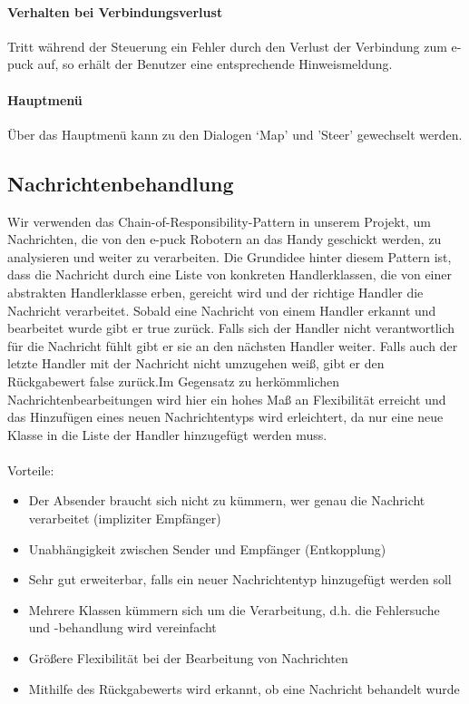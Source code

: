\documentclass[10pt,a4paper]{article}
\begin{document}
	\paragraph*{Verhalten bei Verbindungsverlust} Tritt während der Steuerung ein Fehler durch den Verlust der Verbindung zum e-puck auf, so erhält
	 der Benutzer eine entsprechende Hinweismeldung.
	
	\paragraph*{Hauptmenü} Über das Hauptmenü kann zu den Dialogen `Map' und 'Steer' gewechselt werden.        
      		
  		
  		\subsection{Nachrichtenbehandlung}
  			Wir verwenden das Chain-of-Responsibility-Pattern in unserem Projekt, um Nachrichten, die von den e-puck Robotern an das Handy
  			geschickt werden, zu analysieren und weiter zu verarbeiten. Die Grundidee hinter diesem Pattern ist, dass die Nachricht durch eine Liste
  			von konkreten Handlerklassen, die von einer abstrakten Handlerklasse erben, gereicht wird und der richtige Handler die Nachricht
  			verarbeitet. Sobald eine Nachricht von einem Handler erkannt und bearbeitet wurde gibt er true zurück. Falls sich der Handler nicht
  			verantwortlich für die Nachricht fühlt gibt er sie an den nächsten Handler weiter. Falls auch der letzte Handler mit der Nachricht nicht
  			umzugehen weiß, gibt er den Rückgabewert false zurück.Im Gegensatz zu herkömmlichen Nachrichtenbearbeitungen wird hier ein
  			hohes Maß an Flexibilität erreicht und das Hinzufügen eines neuen Nachrichtentyps wird erleichtert, da nur eine neue Klasse in die
  			Liste der Handler hinzugefügt werden muss. \\ \\
  			Vorteile:
  			\begin{itemize}
  				\item Der Absender braucht sich nicht zu kümmern, wer genau die Nachricht verarbeitet (impliziter Empfänger)
  				\item Unabhängigkeit zwischen Sender und Empfänger (Entkopplung)
  				\item Sehr gut erweiterbar, falls ein neuer Nachrichtentyp hinzugefügt werden soll
  				\item Mehrere Klassen kümmern sich um die Verarbeitung, d.h. die Fehlersuche und -behandlung wird vereinfacht
  				\item Größere Flexibilität bei der Bearbeitung von Nachrichten
  				\item Mithilfe des Rückgabewerts wird erkannt, ob eine Nachricht behandelt wurde
  			\end{itemize}  
\end{document}

